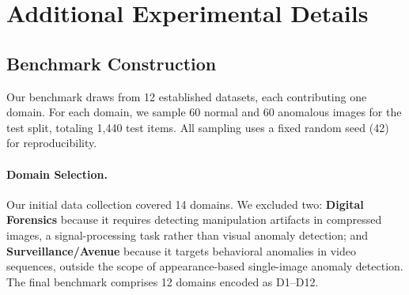 \section{Additional Experimental Details}
\label{app:details}

\subsection{Benchmark Construction}
\label{app:benchmark}

Our benchmark draws from 12 established datasets, each contributing one domain. For each domain, we sample 60 normal and 60 anomalous images for the test split, totaling 1{,}440 test items. All sampling uses a fixed random seed (42) for reproducibility.

\paragraph{Domain Selection.}
Our initial data collection covered 14 domains. We excluded two: \textbf{Digital Forensics} because it requires detecting manipulation artifacts in compressed images, a signal-processing task rather than visual anomaly detection; and \textbf{Surveillance/Avenue} because it targets behavioral anomalies in video sequences, outside the scope of appearance-based single-image anomaly detection. The final benchmark comprises 12 domains encoded as D1--D12.

